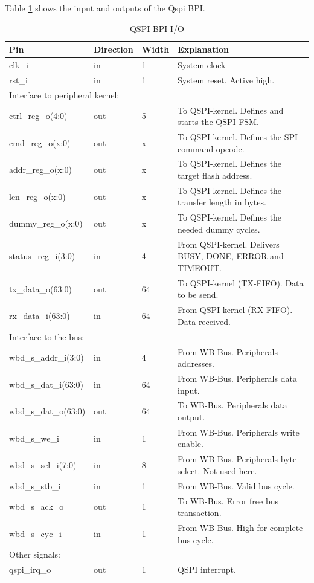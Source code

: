 
Table \ref{tab:asQspiPer05} shows the input and outputs of the Qspi BPI.
\begin{table}[H]
\caption{QSPI BPI I/O}
\label{tab:asQspiPer05}
\centering
\begin{tabularx}{\textwidth}{|l |l |l |X|}
  \hline
  Pin & Direction & Width & Explanation \\
  \hline
  \hline
  clk\_i & in & 1 & System clock \\
  \hline
  rst\_i & in & 1 & System reset. Active high. \\
  \hline
  \multicolumn{4}{|l|}{Interface to peripheral kernel:} \\
  \hline
  ctrl\_reg\_o(4:0) & out & 5 & To QSPI-kernel. Defines and starts the QSPI FSM. \\
  \hline
  cmd\_reg\_o(x:0) & out & x & To QSPI-kernel. Defines the SPI command opcode. \\
  \hline
  addr\_reg\_o(x:0) & out & x & To QSPI-kernel. Defines the target flash address. \\
  \hline
  len\_reg\_o(x:0) & out & x & To QSPI-kernel. Defines the transfer length in bytes. \\
  \hline
  dummy\_reg\_o(x:0) & out & x & To QSPI-kernel. Defines the needed dummy cycles. \\
  \hline
  status\_reg\_i(3:0) & in & 4 & From QSPI-kernel. Delivers BUSY, DONE, ERROR and TIMEOUT. \\
  \hline
  tx\_data\_o(63:0) & out & 64 & To QSPI-kernel (TX-FIFO). Data to be send. \\
  \hline
  rx\_data\_i(63:0) & in & 64 & From QSPI-kernel (RX-FIFO). Data received. \\
  \hline
  \multicolumn{4}{|l|}{Interface to the bus:} \\
  \hline
  wbd\_s\_addr\_i(3:0) & in & 4 &  From WB-Bus. Peripherals addresses. \\
  \hline
  wbd\_s\_dat\_i(63:0) & in & 64 &  From WB-Bus. Peripherals data input. \\
  \hline
  wbd\_s\_dat\_o(63:0) & out & 64 &  To WB-Bus. Peripherals data output. \\
  \hline
  wbd\_s\_we\_i & in & 1 &  From WB-Bus. Peripherals write enable. \\
  \hline
  wbd\_s\_sel\_i(7:0) & in & 8 &  From WB-Bus. Peripherals byte select. Not used here. \\
  \hline
  wbd\_s\_stb\_i & in & 1 &  From WB-Bus. Valid bus cycle.  \\
  \hline
  wbd\_s\_ack\_o & out & 1 &  To WB-Bus. Error free bus transaction.   \\
  \hline
  wbd\_s\_cyc\_i & in & 1 &  From WB-Bus. High for complete bus cycle.  \\
  \hline
  \multicolumn{4}{|l|}{Other signals:} \\
  \hline
  qspi\_irq\_o & out & 1 &  QSPI interrupt.  \\
  \hline
\end{tabularx}
\end{table}
